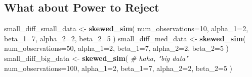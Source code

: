 \documentclass[
]{book}
\newenvironment{Shaded}{\begin{snugshade}}{\end{snugshade}}
\newcommand{\AttributeTok}[1]{\textcolor[rgb]{0.13,0.29,0.53}{#1}}
\newcommand{\CommentTok}[1]{\textcolor[rgb]{0.56,0.35,0.01}{\textit{#1}}}
\newcommand{\DecValTok}[1]{\textcolor[rgb]{0.00,0.00,0.81}{#1}}
\newcommand{\FunctionTok}[1]{\textcolor[rgb]{0.13,0.29,0.53}{\textbf{#1}}}
\newcommand{\NormalTok}[1]{#1}
\newcommand{\OtherTok}[1]{\textcolor[rgb]{0.56,0.35,0.01}{#1}}
\theoremstyle{definition}
\theoremstyle{definition}
\theoremstyle{definition}
\theoremstyle{definition}
\theoremstyle{remark}
\begin{document}
\hypertarget{what-about-power-to-reject}{%
\subsection{What about Power to Reject}\label{what-about-power-to-reject}}

\begin{Shaded}
\begin{Highlighting}[]
\NormalTok{small\_diff\_small\_data }\OtherTok{\textless{}{-}} \FunctionTok{skewed\_sim}\NormalTok{(}
  \AttributeTok{num\_observations=}\DecValTok{10}\NormalTok{, }
  \AttributeTok{alpha\_1=}\DecValTok{2}\NormalTok{, }\AttributeTok{beta\_1=}\DecValTok{7}\NormalTok{, }
  \AttributeTok{alpha\_2=}\DecValTok{2}\NormalTok{, }\AttributeTok{beta\_2=}\DecValTok{5}
\NormalTok{  )}
\NormalTok{small\_diff\_med\_data }\OtherTok{\textless{}{-}} \FunctionTok{skewed\_sim}\NormalTok{(}
  \AttributeTok{num\_observations=}\DecValTok{50}\NormalTok{, }
  \AttributeTok{alpha\_1=}\DecValTok{2}\NormalTok{, }\AttributeTok{beta\_1=}\DecValTok{7}\NormalTok{, }
  \AttributeTok{alpha\_2=}\DecValTok{2}\NormalTok{, }\AttributeTok{beta\_2=}\DecValTok{5}
\NormalTok{  )}
\NormalTok{small\_diff\_big\_data }\OtherTok{\textless{}{-}} \FunctionTok{skewed\_sim}\NormalTok{( }\CommentTok{\# haha, "big data"}
  \AttributeTok{num\_observations=}\DecValTok{100}\NormalTok{, }
  \AttributeTok{alpha\_1=}\DecValTok{2}\NormalTok{, }\AttributeTok{beta\_1=}\DecValTok{7}\NormalTok{, }
  \AttributeTok{alpha\_2=}\DecValTok{2}\NormalTok{, }\AttributeTok{beta\_2=}\DecValTok{5}
\NormalTok{  )}
\end{Highlighting}
\end{Shaded}
\end{document}
